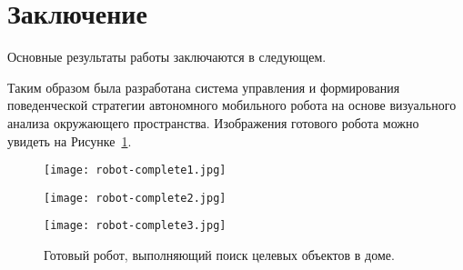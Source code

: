 \chapter*{Заключение}                       %


Основные результаты работы заключаются в следующем.

Таким образом была разработана система управления и формирования поведенческой стратегии автономного мобильного робота на основе визуального анализа окружающего пространства. Изображения готового робота можно увидеть на Рисунке~\ref{fig:robot-complete}.

\begin{figure}[ht]
  \begin{minipage}[b][][b]{0.32\linewidth}\centering
    \texttt{[image: robot-complete1.jpg]} \\
  \end{minipage}
  \hfill
  \begin{minipage}[b][][b]{0.32\linewidth}\centering
    \texttt{[image: robot-complete2.jpg]} \\
  \end{minipage}
  \hfill
  \begin{minipage}[b][][b]{0.32\linewidth}\centering
    \texttt{[image: robot-complete3.jpg]} \\
  \end{minipage}
  \caption{Готовый робот, выполняющий поиск целевых объектов в доме.}
  \label{fig:robot-complete}
\end{figure}